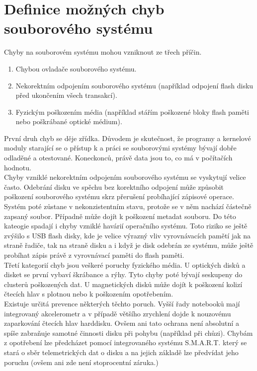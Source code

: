\chapter{Definice možných chyb souborového systému}
\label{ch:definice-chyb}
Chyby na souborovém systému mohou vzniknout ze třech příčin. 
\begin{enumerate}
    \item Chybou ovladače souborového systému.
    \item Nekorektním odpojením souborového systému (například odpojení flash disku před ukončením všech transakcí).
    \item Fyzickým poškozením média (například stářím poškozené bloky flash paměti nebo poškrábané optické médium).
\end{enumerate}
První druh chyb se děje zřídka. Důvodem je skutečnost, že programy a kernelové moduly starající se o přístup k a práci se souborovými systémy bývají dobře odladěné a otestované. Koneckonců, právě data jsou to, co má v počítačích hodnotu.\\
Chyby vzniklé nekorektním odpojením souborového systému se vyskytují velice často. Odebrání disku ve spěchu bez korektního odpojení může způsobit poškození souborového systému skrz přerušení probíhající zápisové operace. Systém poté zůstane v nekonzistentním stavu, protože se v něm nachází částečně zapsaný soubor. Případně může dojít k poškození metadat souboru. Do této kateogie spadají i chyby vzniklé havárií operačního systému. Toto riziko se ještě zvýšilo s USB flash disky, kde je velice výrazný vliv vyrovnávacích pamětí jak na straně řadiče, tak na straně disku a i když je disk odebrán ze systému, může ještě probíhat zápis právě z vyrovnávací paměti do flash paměti.\\
Třetí kategorií chyb jsou veškeré poruchy fyzického média. U optických disků a disket se první vybaví škrábance a rýhy. Tyto chyby poté bývají seskupeny do clusterů poškozených dat. U magnetických disků může dojít k poškození kolizí čtecích hlav s plotnou nebo k poškozením opotřebením.\\
Existuje určitá prevence některých těchto poruch. Vyšší řady notebooků mají integrovaný akcelerometr a v případě většího zrychlení dojde k nouzovému zaparkování čtecích hlav harddisku. Ovšem ani tato ochrana není absolutní a spíše zabraňuje samotné činnosti disku při pohybu (například při chůzi). Chybám z opotřebení lze předcházet pomocí integrovaného systému S.M.A.R.T. který se stará o sběr telemetrických dat o disku a na jejich základě lze předvídat jeho poruchu (ovšem ani zde není stoprocentní záruka.)\\
